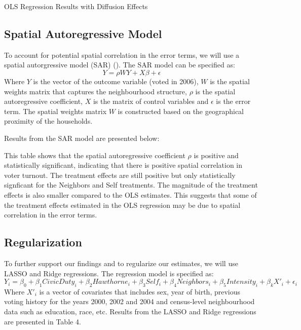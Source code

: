 \documentclass[11pt]{article}
\begin{document}
\begin{table}[H]
    \centering
    \caption{OLS Regression Results with Diffusion Effects}
    
    \label{tab:ols_diffusion}
\end{table}


\subsection{Spatial Autoregressive Model}
To account for potential spatial correlation in the error terms, we will use a spatial autorgressive model (SAR) (\cite{lord_chapter_2021}). The SAR model can be specified as:
\begin{equation}
    Y = \rho W Y + X\beta + \epsilon
\end{equation}
Where $Y$ is the vector of the outcome variable (voted in 2006), $W$ is the spatial weights matrix that captures the neighbourhood structure, $\rho$ is the spatial autoregressive coefficient, $X$ is the matrix of control variables and $\epsilon$ is the error term. The spatial weights matrix $W$ is constructed based on the geographical proximity of the households.

Results from the SAR model are presented below:

\begin{table}[H]
    \begin{centering}
        
    \end{centering}
\end{table}

This table shows that the spatial autoregressive coefficient $\rho$ is positive and statistically significant, indicating that there is positive spatial correlation in voter turnout. The treatment effects are still positive but only statistically signficant for the Neighbors and Self treatments. The magnitude of the treatment effects is also smaller compared to the OLS estimates. This suggests that some of the treatment effects estimated in the OLS regression may be due to spatial correlation in the error terms.

\subsection{Regularization}
To further support our findings and to regularize our estimates, we will use LASSO and Ridge regressions. The regression model is specified as:
\begin{equation}
    Y_i = \beta_0 + \beta_1 CivicDuty_i + \beta_2 Hawthorne_i + \beta_3 Self_i + \beta_4 Neighbors_i + \beta_5 Intensity_i + \beta_k X'_i + \epsilon_i
\end{equation}
Where $X'_i$ is a vector of covariates that includes sex, year of birth, previous voting history for the years 2000, 2002 and 2004 and census-level neighbourhood data such as education, race, etc. Results from the LASSO and Ridge regressions are presented in Table 4.
\end{document}

